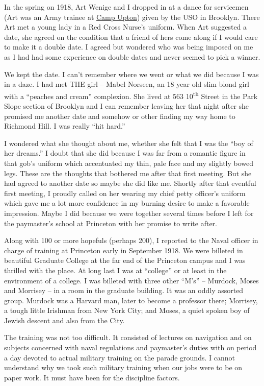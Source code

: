 \documentclass[12pt]{book}              %
\begin{document}
In the spring on 1918, Art Wenige and I dropped in at a dance for servicemen (Art was an Army trainee at \href{http://en.wikipedia.org/wiki/Camp_Upton}{Camp Upton}) given by the USO in Brooklyn. There Art met a young lady in a Red Cross Nurse's uniform. When Art suggested a date, she agreed on the condition that a friend of hers come along if I would care to make it a double date. I agreed but wondered who was being imposed on me as I had had some experience on double dates and never seemed to pick a winner. 

We kept the date. I can't remember where we went or what we did because I was in a daze. I had met THE girl -- Mabel Norseen, an 18 year old slim blond girl with a ``peaches and cream'' complexion. She lived at 563 10\textsuperscript{th} Street in the Park Slope section of Brooklyn and I can remember leaving her that night after she promised me another date and somehow or other finding my way home to Richmond Hill. I was really ``hit hard.''

I wondered what she thought about me, whether she felt that I was the ``boy of her dreams.'' I doubt that she did because I was far from a romantic figure in that gob's uniform which accentuated my thin, pale face and my slightly bowed legs. These are the thoughts that bothered me after that first meeting. But she had agreed to another date so maybe she did like me. Shortly after that eventful first meeting, I proudly called on her wearing my chief petty officer's uniform which gave me a lot more confidence in my burning desire to make a favorable impression. Maybe I did because we were together several times before I left for the paymaster's school at Princeton with her promise to write after. 

Along with 100 or more hopefuls (perhaps 200), I reported to the Naval officer in charge of training at Princeton early in September 1918. We were billeted in beautiful Graduate College at the far end of the Princeton campus and I was thrilled with the place. At long last I was at ``college'' or at least in the environment of a college. I was billeted with three other ``M's'' -- Murdock, Moses and Morrisey -- in a room in the graduate building. It was an oddly assorted group. Murdock was a Harvard man, later to become a professor there; Morrisey, a tough little Irishman from New York City; and Moses, a quiet spoken boy of Jewish descent and also from the City. 

The training was not too difficult. It consisted of lectures on navigation and on subjects concerned with naval regulations and paymaster's duties with on period a day devoted to actual military training on the parade grounds. I cannot understand why we took such military training when our jobs were to be on paper work. It must have been for the discipline factors. 
\end{document}

